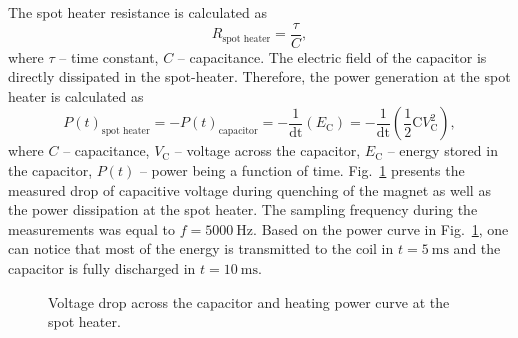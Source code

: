 The spot heater resistance is calculated as
\begin{equation}
    R_\text{spot heater} = \frac{\tau}{C},
\end{equation}
where $\tau$ -- time constant, $C$ -- capacitance. The electric field of the capacitor is directly dissipated in the spot-heater. Therefore, the power generation at the spot heater is calculated as
\begin{equation}
    P(t)_\text{spot heater} = -P(t)_\text{capacitor} = -\frac{1}{\text{dt}} (E_\text{C}) = -\frac{1}{\text{dt}} (\frac{1}{2} \text{C}V_\text{C}^2),
\end{equation}
where $C$ -- capacitance, $V_\text{C}$ -- voltage across the capacitor, $E_\text{C}$ -- energy stored in the capacitor, $P(t)$ -- power being a function of time. Fig.~\ref{fig:capacitor_discharge} presents the measured drop of capacitive voltage during quenching of the magnet as well as the power dissipation at the spot heater. The sampling frequency during the measurements was equal to $f=5000~\text{Hz}$. Based on the power curve in Fig.~\ref{fig:capacitor_discharge}, one can notice that most of the energy is transmitted to the coil in $t=5~\text{ms}$ and the capacitor is fully discharged in $t=10~\text{ms}$.

\begin{figure}[H]
\centering
{}
\caption{Voltage drop across the capacitor and heating power curve at the spot heater.}
\label{fig:capacitor_discharge}
\end{figure}

